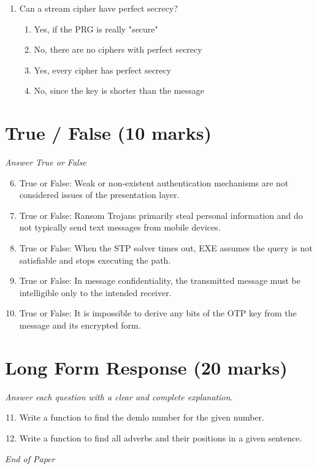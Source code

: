 \documentclass[12pt]{article}
\begin{document}
\begin{enumerate}[label=\arabic*.]
\begin{enumerate}[label=(\alph*)]
    \item Opera browser
    \item Firefox
    \item Chrome
    \item Tor browser
\end{enumerate}
\item Can a stream cipher have perfect secrecy?
\begin{enumerate}[label=(\alph*)]
    \item Yes, if the PRG is really "secure"
    \item No, there are no ciphers with perfect secrecy
    \item Yes, every cipher has perfect secrecy
    \item No, since the key is shorter than the message
\end{enumerate}
\end{enumerate}

\section*{True / False (10 marks)}
\textit{Answer True or False}
\begin{enumerate}[label=\arabic*.]
\setcounter{enumi}{5}
\item True or False: Weak or non-existent authentication mechanisms are not considered issues of the presentation layer.
\item True or False: Ransom Trojans primarily steal personal information and do not typically send text messages from mobile devices.
\item True or False: When the STP solver times out, EXE assumes the query is not satisfiable and stops executing the path.
\item True or False: In message confidentiality, the transmitted message must be intelligible only to the intended receiver.
\item True or False: It is impossible to derive any bits of the OTP key from the message and its encrypted form.
\end{enumerate}

\section*{Long Form Response (20 marks)}
\textit{Answer each question with a clear and complete explanation.}
\begin{enumerate}[label=\arabic*.]
\setcounter{enumi}{10}
\item Write a function to find the demlo number for the given number.
\item Write a function to find all adverbs and their positions in a given sentence.
\end{enumerate}

\vfill
\noindent\textit{End of Paper}
\end{document}
